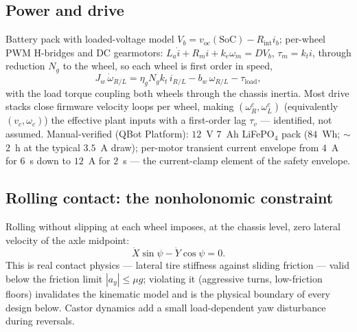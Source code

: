 \documentclass[conference]{IEEEtran}
\begin{document}
\subsection{Power and drive}
Battery pack with loaded-voltage model $V_b = v_{\mathrm{oc}}(\mathrm{SoC}) - R_{\mathrm{int}}i_b$; per-wheel PWM H-bridges and DC gearmotors: $L_a\dot i + R_m i + k_e\omega_m = D V_b$, $\tau_m = k_t i$, through reduction $N_g$ to the wheel, so each wheel is first order in speed,
\begin{equation}
J_w\,\dot\omega_{R/L} = \eta_g N_g k_t\,i_{R/L} - b_w\,\omega_{R/L} - \tau_{\mathrm{load}},
\label{eq:wheel}
\end{equation}
with the load torque coupling both wheels through the chassis inertia. Most drive stacks close firmware velocity loops per wheel, making $(\omega_R^c, \omega_L^c)$ (equivalently $(v_c,\omega_c)$) the effective plant inputs with a first-order lag $\tau_v$ --- identified, not assumed. Manual-verified (QBot Platform): $12$~V $7$~Ah LiFePO$_4$ pack ($84$~Wh; $\sim$2~h at the typical $3.5$~A draw); per-motor transient current envelope from $4$~A for $6$~s down to $12$~A for $2$~s --- the current-clamp element of the safety envelope.

\subsection{Rolling contact: the nonholonomic constraint}
Rolling without slipping at each wheel imposes, at the chassis level, zero lateral velocity of the axle midpoint:
\begin{equation}
\dot X\sin\psi - \dot Y\cos\psi = 0 .
\label{eq:nonholo}
\end{equation}
This is real contact physics --- lateral tire stiffness against sliding friction --- valid below the friction limit $|a_y| \le \mu g$; violating it (aggressive turns, low-friction floors) invalidates the kinematic model and is the physical boundary of every design below. Castor dynamics add a small load-dependent yaw disturbance during reversals.
\end{document}
